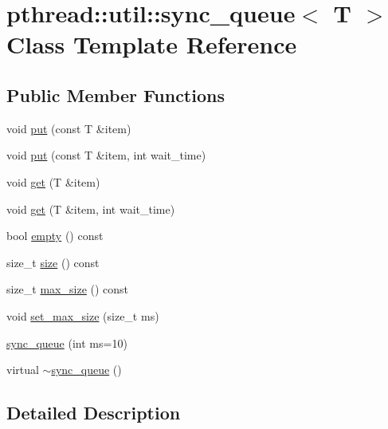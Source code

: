 \hypertarget{classpthread_1_1util_1_1sync__queue}{\section{pthread\+:\+:util\+:\+:sync\+\_\+queue$<$ T $>$ Class Template Reference}
\label{classpthread_1_1util_1_1sync__queue}
}
\subsection*{Public Member Functions}
\begin{DoxyCompactItemize}
\item 
void \hyperlink{classpthread_1_1util_1_1sync__queue_a235265f27a6d2500ab2b56c83d703f06}{put} (const T \&item)
\item 
void \hyperlink{classpthread_1_1util_1_1sync__queue_aa507ddc9d8d86fa8d9510c3bc63a877b}{put} (const T \&item, int wait\+\_\+time)
\item 
void \hyperlink{classpthread_1_1util_1_1sync__queue_ac30ef4e626177ae47f27399ff3c8f28b}{get} (T \&item)
\item 
void \hyperlink{classpthread_1_1util_1_1sync__queue_ae5354915a1c76760924855318a11be04}{get} (T \&item, int wait\+\_\+time)
\item 
bool \hyperlink{classpthread_1_1util_1_1sync__queue_ad915d5b45a49f6f6bd09b5bdf170dd10}{empty} () const 
\item 
size\+\_\+t \hyperlink{classpthread_1_1util_1_1sync__queue_a99e07d02c268e4a7c6cab7ee5ee06274}{size} () const 
\item 
size\+\_\+t \hyperlink{classpthread_1_1util_1_1sync__queue_ae805476dd5db21e3b48b2d7ae7394305}{max\+\_\+size} () const 
\item 
void \hyperlink{classpthread_1_1util_1_1sync__queue_a5ac6e6e5d64171d63db00c60cb98f693}{set\+\_\+max\+\_\+size} (size\+\_\+t ms)
\item 
\hyperlink{classpthread_1_1util_1_1sync__queue_a2ca4ec947675b48411fda94770e80d3f}{sync\+\_\+queue} (int ms=10)
\item 
virtual \hyperlink{classpthread_1_1util_1_1sync__queue_ad2f95ba727c920fe9614f54377e32fe1}{$\sim$sync\+\_\+queue} ()
\end{DoxyCompactItemize}


\subsection{Detailed Description}
